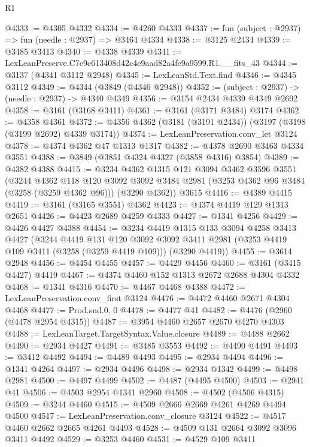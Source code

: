 \begin{lexlean}{R1}
\begin{coremodule}
@4333 := @4305 @4332
@4334 := @4260 @4333
@4337 := fun (subject : @2937) => fun (needle : @2937) => @3464 @4334
@4338 := @3125 @2434
@4339 := @3485 @3413
@4340 := @4338 @4339
@4341 := LexLeanPreserve.C7c9c613408d42c4e9aad82a4fc9a9599.R1.__fits_43
@4344 := @3137 (@4341 @3112 @2948)
@4345 := LexLeanStd.Text.find
@4346 := @4345 @3112
@4349 := @4344 (@3849 (@4346 @2948))
@4352 := (subject : @2937) -> (needle : @2937) -> @4340 @4349
@4356 := @3154 @2434 @4339 @4349 @2692
@4358 := @3161 (@3168 @3411)
@4361 := @3161 (@3171 @3484) @3174
@4362 := @4358 @4361
@4372 := @4356 @4362 (@3181 (@3191 @2434)) (@3197 (@3198 (@3199 @2692) @4339 @3174))
@4374 := LexLeanPreservation.conv_let @3124
@4378 := @4374 @4362 @47 @1313 @1317
@4382 := @4378 @2690 @3463 @4334 @3551
@4388 := @3849 (@3851 @4324 @4327 (@3858 @4316) @3854)
@4389 := @4382 @4388
@4415 := @3234
    @4362
    @1315
    @121
    @3094
    @3462
    @3596
    @3551
    (@3244
      @4362
      @118
      @120
      @3092
      @3092
      @3484
      @2981
      (@3253 @4362 @96 @3484 (@3258 (@3259 @4362 @96)))
      (@3290 @4362))
    @3615
@4416 := @4389 @4415
@4419 := @3161 (@3165 @3551) @4362
@4423 := @4374 @4419 @129 @1313 @2651
@4426 := @4423 @2689 @4259 @4333
@4427 := @1341 @4256
@4429 := @4426 @4427 @4388
@4454 := @3234
    @4419
    @1315
    @133
    @3094
    @4258
    @3413
    @4427
    (@3244
      @4419
      @131
      @120
      @3092
      @3092
      @3411
      @2981
      (@3253 @4419 @109 @3411 (@3258 (@3259 @4419 @109)))
      (@3290 @4419))
@4455 := @3614 @2948
@4456 := @4454 @4455
@4457 := @4429 @4456
@4460 := @3161 (@3415 @4427) @4419
@4467 := @4374 @4460 @152 @1313 @2672 @2688 @4304 @4332
@4468 := @1341 @4316
@4470 := @4467 @4468 @4388
@4472 := LexLeanPreservation.conv_first @3124
@4476 := @4472 @4460 @2671 @4304 @4468
@4477 := Prod.snd.{0, 0}
@4478 := @4477 @41
@4482 := @4476 (@2960 (@4478 @2954 @4315))
@4487 := @3954 @4460 @2657 @2670 @4270 @4303
@4488 := LexLeanTarget.TargetSyntax.Value.closure
@4489 := @4488 @2662
@4490 := @2934 @4427
@4491 := @3485 @3553
@4492 := @4490 @4491
@4493 := @3412 @4492
@4494 := @4489 @4493
@4495 := @2934 @4494
@4496 := @1341 @4264
@4497 := @2934 @4496
@4498 := @2934 @1342
@4499 := @4498 @2981
@4500 := @4497 @4499
@4502 := @4487 (@4495 @4500)
@4503 := @2941 @41
@4506 := @4503 @2954 @1341 @2960
@4508 := @4502 (@4506 @4315)
@4509 := @3244 @4460
@4515 := @4509 @2666 @2669 @4261 @4269 @4494 @4500
@4517 := LexLeanPreservation.conv_closure @3124
@4522 := @4517 @4460 @2662 @2665 @4261 @4493
@4528 := @4509 @131 @2664 @3092 @3096 @3411 @4492
@4529 := @3253 @4460
@4531 := @4529 @109 @3411

\end{coremodule}
\end{lexlean}
